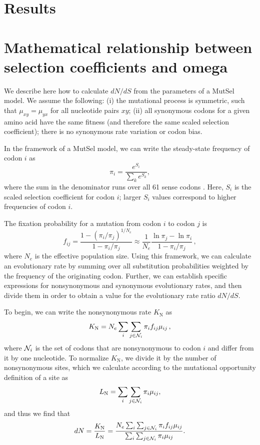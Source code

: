 \documentclass[11pt]{article}
\begin{document}
\section*{Results}


\section*{Mathematical relationship between selection coefficients and omega}


We describe here how to calculate $dN/dS$ from the parameters of a MutSel model. We assume the following: (i) the mutational process is symmetric, such that $\mu_{xy}=\mu_{yx}$ for all nucleotide pairs $xy$; (ii) all synonymous codons for a given amino acid have the same fitness (and therefore the same scaled selection coefficient); there is no synonymous rate variation or codon bias.

In the framework of a MutSel model, we can write the steady-state frequency of codon $i$ as
\begin{equation}\label{eq:pi_i}
 \pi_i=\frac{e^{S_i}}{\sum_k e^{S_k}},
\end{equation}
where the sum in the denominator runs over all 61 sense codons \cite{SellaHirsh2005}. Here, $S_i$ is the scaled selection coefficient for codon $i$; larger $S_i$ values correspond to higher frequencies of codon $i$.

The fixation probability for a mutation from codon $i$ to codon $j$ is \cite{SellaHirsh2005}
\begin{equation}\label{eq:f_ij}
 f_{ij} = \frac{1-(\pi_i/\pi_j)^{1/N_e}}{1-\pi_i/\pi_j}
  \approx \frac{1}{N_e} \frac{\ln \pi_j - \ln \pi_i}{1-\pi_i/\pi_j}\,,
\end{equation}
where $N_e$ is the effective population size. Using this framework, we can calculate an evolutionary rate by summing over all substitution probabilities weighted by the frequency of the originating codon. Further, we can establish specific expressions for nonsynonymous and synonymous evolutionary rates, and then divide them in order to obtain a value for the evolutionary rate ratio $dN/dS$.

To begin, we can write the nonsynonymous rate $K_\text{N}$ as 
\begin{equation}\label{eq:KN}
  K_\text{N} = N_e \sum_i \sum_{j \in {\cal N}_i} \pi_i  f_{ij}\mu_{ij}\,,
\end{equation}
where ${\cal N}_i$ is the set of codons that are nonsynonymous to codon $i$ and differ from it by one nucleotide. To normalize $K_\text{N}$, we divide it by the number of nonsynonymous sites, which we calculate according to the mutational opportunity definition of a site \cite{GoldmanYang1994, Yang2006} as 
\begin{equation}\label{eq:LN}
  L_\text{N} = \sum_i \sum_{j \in {\cal N}_i} \pi_i \mu_{ij}, 
\end{equation} and thus we find that 
\begin{equation}\label{eq:dN}
  dN = \frac{K_\text{N}}{L_\text{N}}=\frac{ N_e \sum_i \sum_{j \in {\cal N}_i} \pi_i f_{ij} \mu_{ij} } {\sum_i \sum_{j \in {\cal N}_i} \pi_i \mu_{ij} }.
\end{equation}
\end{document}
